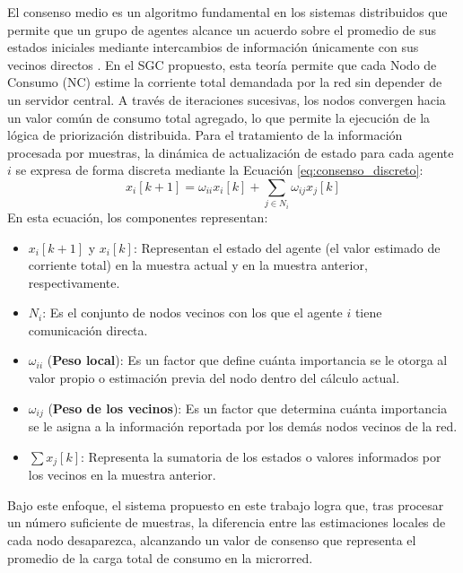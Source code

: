 El consenso medio es un algoritmo fundamental en los sistemas distribuidos que permite que un grupo de agentes alcance un acuerdo sobre el promedio de sus estados iniciales mediante intercambios de información únicamente con sus vecinos directos \cite{OlfatiSaber2004}. En el SGC propuesto, esta teoría permite que cada Nodo de Consumo (NC) estime la corriente total demandada por la red sin depender de un servidor central. A través de iteraciones sucesivas, los nodos convergen hacia un valor común de consumo total agregado, lo que permite la ejecución de la lógica de priorización distribuida. Para el tratamiento de la información procesada por muestras, la dinámica de actualización de estado para cada agente $i$ se expresa de forma discreta mediante la Ecuación \ref{eq:consenso_discreto}:
\begin{equation}x_i[k+1] = \omega_{ii} x_i[k] + \sum_{j \in N_i} \omega_{ij} x_j[k]\label{eq:consenso_discreto}\end{equation}
En esta ecuación, los componentes representan:
\begin{itemize}
    \item $x_i[k+1]$ y $x_i[k]$: Representan el estado del agente (el valor estimado de corriente total) en la muestra actual y en la muestra anterior, respectivamente.
    \item $N_i$: Es el conjunto de nodos vecinos con los que el agente $i$ tiene comunicación directa.
    \item $\omega_{ii}$ (\textbf{Peso local}): Es un factor que define cuánta importancia se le otorga al valor propio o estimación previa del nodo dentro del cálculo actual.
    \item $\omega_{ij}$ (\textbf{Peso de los vecinos}): Es un factor que determina cuánta importancia se le asigna a la información reportada por los demás nodos vecinos de la red.\item $\sum x_j[k]$: Representa la sumatoria de los estados o valores informados por los vecinos en la muestra anterior.
\end{itemize}
Bajo este enfoque, el sistema propuesto en este trabajo logra que, tras procesar un número suficiente de muestras, la diferencia entre las estimaciones locales de cada nodo desaparezca, alcanzando un valor de consenso que representa el promedio de la carga total de consumo en la microrred.

